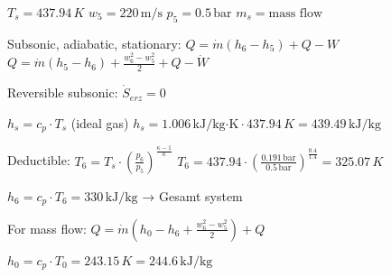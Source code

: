 \( T_s = 437.94 \, K \)  
\( w_5 = 220 \, \text{m/s} \)  
\( p_5 = 0.5 \, \text{bar} \)  
\( m_s = \text{mass flow} \)  

Subsonic, adiabatic, stationary:  
\( Q = \dot{m} (h_6 - h_5) + Q - W \)  
\( Q = \dot{m} (h_5 - h_6) + \frac{w_6^2 - w_5^2}{2} + Q - \dot{W} \)  

Reversible subsonic:  
\( \dot{S}_{erz} = 0 \)  

\( h_s = c_p \cdot T_s \) (ideal gas)  
\( h_s = 1.006 \, \text{kJ/kg·K} \cdot 437.94 \, K = 439.49 \, \text{kJ/kg} \)  

Deductible:  
\( T_6 = T_s \cdot \left( \frac{p_6}{p_5} \right)^{\frac{\kappa - 1}{\kappa}} \)  
\( T_6 = 437.94 \cdot \left( \frac{0.191 \, \text{bar}}{0.5 \, \text{bar}} \right)^{\frac{0.4}{1.4}} = 325.07 \, K \)  

\( h_6 = c_p \cdot T_6 = 330 \, \text{kJ/kg} \) → Gesamt system  

For mass flow:  
\( Q = \dot{m} \left( h_0 - h_6 + \frac{w_6^2 - w_5^2}{2} \right) + Q \)  

\( h_0 = c_p \cdot T_0 = 243.15 \, K = 244.6 \, \text{kJ/kg} \)
